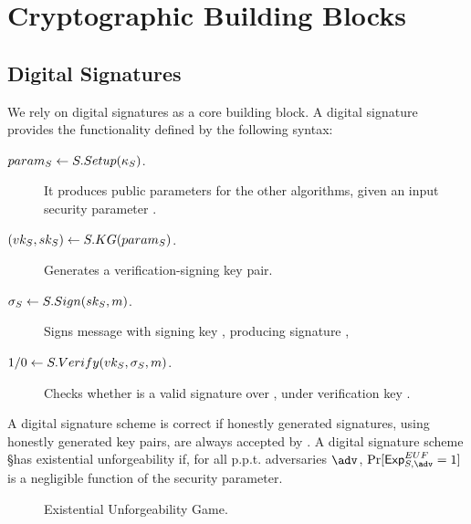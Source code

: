 \section{Cryptographic Building Blocks}
\label{app:crypto-building-blocks}

\subsection{Digital Signatures}
\label{sapp:digital-signatures}

We rely on digital signatures as a core building block. A digital signature
provides the functionality defined by the following syntax:

\begin{description}
\item[$param_{S} \gets S.Setup(\kappa_{S})$.] It produces public parameters for the
  other algorithms, given an input security parameter \Ssecpar.
\item[$(vk_{S},sk_{S}) \gets S.KG(param_{S})$.] Generates a verification-signing
  key pair.
\item[$\sigma_{S} \gets S.Sign(sk_{S},m)$.] Signs message \msg with signing key
  \Ssk, producing signature \Ssig,  
\item[$1/0 \gets S.Verify(vk_{S},\sigma_{S},m)$.] Checks whether \Ssig is a valid
  signature over \msg, under verification key \Svk.
\end{description}

A digital signature scheme is correct if honestly generated signatures, using
honestly generated key pairs, are always accepted by \SVerify. 
%
A digital signature scheme \S has existential unforgeability if, for all p.p.t.
adversaries $\adv$, $\Pr[\ExpEUF = 1]$ is a negligible function of the
security parameter.

\begin{figure}[ht!]
  \begin{minipage}[t]{0.5\textwidth}
  \end{minipage}
  \label{fig:euf-game}
  \caption{Existential Unforgeability Game.}
\end{figure}

